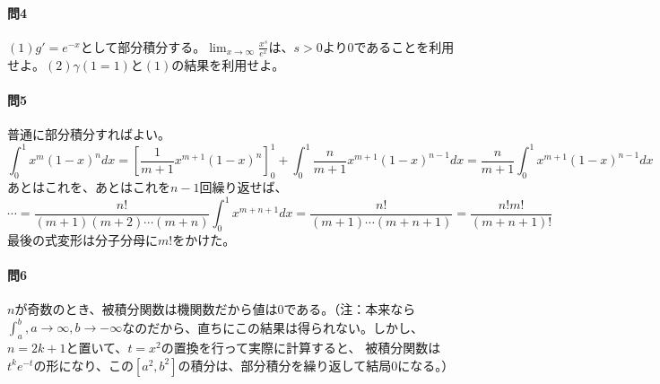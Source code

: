 \documentclass[a4j,dvipdfmx]{jsarticle}
\begin{document}
                    \paragraph{問4}
                        $(1)g' = e^{-x}$として部分積分する。$\displaystyle\lim_{x\to\infty} \frac{x^s}{e^x}$は、$s>0$より$0$であることを利用せよ。\hspace{1mm}$(2)\gamma(1=1)$と$(1)$の結果を利用せよ。

                    \paragraph{問5}普通に部分積分すればよい。
                        \begin{equation*}
                            \int_{0}^{1}x^{m}(1-x)^ndx = \left[\frac{1}{m+1}x^{m+1}(1-x)^n\right]_0^1 + \int_{0}^{1}\frac{n}{m+1}x^{m+1}(1-x)^{n-1}dx = \frac{n}{m+1}\int_0^1 x^{m+1}(1-x)^{n-1}dx
                        \end{equation*}
                        あとはこれを、あとはこれを$n-1$回繰り返せば、
                        \begin{equation*}
                            \cdots = \frac{n!}{(m+1)(m+2)\cdots(m+n)}\int_{0}^{1}x^{m+n+1}dx = \frac{n!}{(m+1)\cdots (m+n+1)}=\frac{n!m!}{(m+n+1)!}
                        \end{equation*}
                        最後の式変形は分子分母に$m!$をかけた。
                    \clearpage
                    \paragraph{問6}
                        $n$が奇数のとき、被積分関数は機関数だから値は$0$である。（注：本来なら$\int_a^b,a\to\infty,b\to-\infty$なのだから、直ちにこの結果は得られない。しかし、$n=2k+1$と置いて、$t=x^2$の置換を行って実際に計算すると、
                        被積分関数は$t^{k}e^{-t}$の形になり、この$[a^2,b^2]$の積分は、部分積分を繰り返して結局0になる。）
\end{document}
